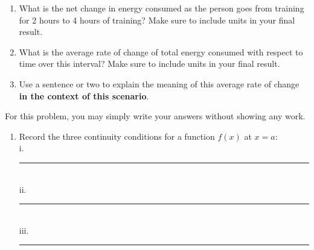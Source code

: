 \documentclass[11pt]{article}
\begin{document}
\begin{enumerate}
\begin{center}
\begin{tikzpicture}[scale=0.9]
\end{tikzpicture}
\end{center}



\begin{enumerate}
    \item What is the net change in energy consumed as the person goes from training for
    2 hours to 4 hours of training? Make sure to include units in your final result.

    \vfill

    \item What is the average rate of change of total energy consumed with respect to time
    over this interval? Make sure to include units in your final result.

    \vfill

    \item Use a sentence or two to explain the meaning of this average rate of change
    \textbf{in the context of this scenario}.  
    

    \vfill
\end{enumerate}




\newpage


For this problem, you may simply write your answers without showing any work.

\begin{enumerate}
    \item[(a)] Record the three continuity conditions for a function \(f(x)\) at \(x = a\):\\

    i. \rule{12cm}{0.4pt} \vspace{0.5cm} \\

    ii. \rule{12cm}{0.4pt} \vspace{0.5cm} \\

    iii. \rule{12cm}{0.4pt} \vspace{0.5cm} \\



\end{enumerate}
\end{enumerate}
\end{document}

